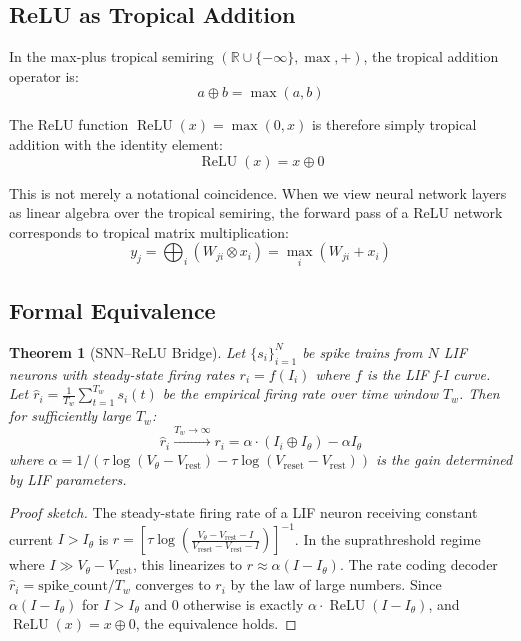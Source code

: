 \documentclass[10pt]{article}
\newtheorem{theorem}{Theorem}
\newcommand{\relu}{\operatorname{ReLU}}
\newcommand{\tropplus}{\oplus}
\begin{document}
\subsection{ReLU as Tropical Addition}

In the max-plus tropical semiring $(\mathbb{R} \cup \{-\infty\}, \max, +)$,
the tropical addition operator is:
\begin{equation}
a \tropplus b = \max(a, b)
\end{equation}

The ReLU function $\relu(x) = \max(0, x)$ is therefore simply tropical addition
with the identity element:
\begin{equation}
\label{eq:relu-tropical}
\relu(x) = x \tropplus 0
\end{equation}

This is not merely a notational coincidence.
When we view neural network layers as linear algebra over the tropical semiring,
the forward pass of a ReLU network corresponds to tropical matrix multiplication:
\begin{equation}
y_j = \bigoplus_i (W_{ji} \otimes x_i) = \max_i (W_{ji} + x_i)
\end{equation}

\subsection{Formal Equivalence}

\begin{theorem}[SNN--ReLU Bridge]
\label{thm:bridge}
Let $\{s_i\}_{i=1}^N$ be spike trains from $N$ LIF neurons with steady-state
firing rates $r_i = f(I_i)$ where $f$ is the LIF f-I curve.
Let $\hat{r}_i = \frac{1}{T_w} \sum_{t=1}^{T_w} s_i(t)$ be the empirical firing
rate over time window $T_w$.
Then for sufficiently large $T_w$:
\begin{equation}
\hat{r}_i \xrightarrow{T_w \to \infty} r_i = \alpha \cdot (I_i \tropplus I_\theta) - \alpha I_\theta
\end{equation}
where $\alpha = 1/(\tau \log(V_\theta - V_\mathrm{rest}) - \tau \log(V_\mathrm{reset} - V_\mathrm{rest}))$
is the gain determined by LIF parameters.
\end{theorem}

\begin{proof}[Proof sketch]
The steady-state firing rate of a LIF neuron receiving constant current $I > I_\theta$
is $r = [\tau \log(\frac{V_\theta - V_\mathrm{rest} - I}{V_\mathrm{reset} - V_\mathrm{rest} - I})]^{-1}$.
In the suprathreshold regime where $I \gg V_\theta - V_\mathrm{rest}$,
this linearizes to $r \approx \alpha(I - I_\theta)$.
The rate coding decoder $\hat{r}_i = \text{spike\_count}/T_w$ converges to $r_i$
by the law of large numbers.
Since $\alpha(I - I_\theta)$ for $I > I_\theta$ and $0$ otherwise is exactly
$\alpha \cdot \relu(I - I_\theta)$, and $\relu(x) = x \tropplus 0$,
the equivalence holds.
\end{proof}
\end{document}
